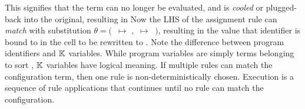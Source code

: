 This signifies that the term can no longer be evaluated, and is \emph{cooled}
or plugged-back into the original, resulting in 
Now the LHS of the assignment rule can \emph{match} with substitution $\theta =
($\ $ \mapsto $ $,$  $\mapsto\ $ $)$, resulting in the value that identifier 
is bound to in the  cell to be rewritten to .
Note the difference between program identifiers and $\mathbb{K}$ variables. While
program variables are simply terms belonging to sort ,
$\mathbb{K}$ variables have logical meaning. If multiple rules can match
the configuration term, then one rule is non-deterministically chosen.
Execution is a sequence of rule applications that continues until no
rule can match the configuration.

